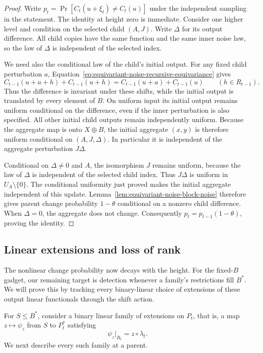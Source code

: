 \begin{proof}
Write $p_t=\Pr[C_t(u+\xi_t)\ne C_t(u)]$ under the independent
sampling in the statement.  The identity at height zero is immediate.
Consider one higher level and
condition on the selected child $(A,J)$.  Write $\Delta$ for its output
difference.  All child copies have the same function and the same inner
noise law, so the law of $\Delta$ is independent of the selected index.

We need also the conditional law of the child's initial output.
For any fixed child perturbation $a$, Equation~\eqref{eq:equivariant-noise-recursive-equivariance}
gives
\[
 C_{t-1}(u+a+h)+C_{t-1}(u+h)
 =C_{t-1}(u+a)+C_{t-1}(u)
 \qquad(h\in R_{t-1}).
\]
Thus the difference is invariant under these shifts, while the initial
output is translated by every element of $B$.  On uniform input its
initial output remains uniform conditional on the difference, even if the
inner perturbation is also specified.  All other initial child outputs
remain independently uniform.  Because the aggregate map is onto
$X\oplus B$, the initial aggregate $(x,y)$ is therefore uniform
conditional on $(A,J,\Delta)$.  In particular it is independent of the
aggregate perturbation $J\Delta$.

Conditional on $\Delta\ne0$ and $A$, the isomorphism $J$ remains uniform,
because the law of $\Delta$ is independent of the selected child index.
Thus $J\Delta$ is uniform in $U_A\setminus\{0\}$.  The conditional
uniformity just proved makes the initial aggregate independent of this
update.  Lemma~\ref{lem:equivariant-noise-block-noise} therefore gives parent change
probability $1-\theta$ conditional on a nonzero child difference.  When
$\Delta=0$, the aggregate does not change.  Consequently
$p_t=p_{t-1}(1-\theta)$, proving the identity.
\end{proof}

\subsection{Linear extensions and loss of rank}

The nonlinear change probability now decays with the height.  For the
fixed-$B$ gadget, our remaining target is detection whenever a family's
restrictions fill $B^*$.  We will prove this by tracking every binary-linear
choice of extensions of these output linear functionals through the shift action.

For $S\le B^*$, consider a binary linear family of extensions on $P_t$, that is, a map
$z\mapsto\psi_z$ from $S$ to $P_t^*$ satisfying
\begin{equation}\label{eq:equivariant-noise-extensions-definition}
 \psi_z|_{R_t}=z\circ\lambda_t.
\end{equation}
We next describe every such family at a parent.

